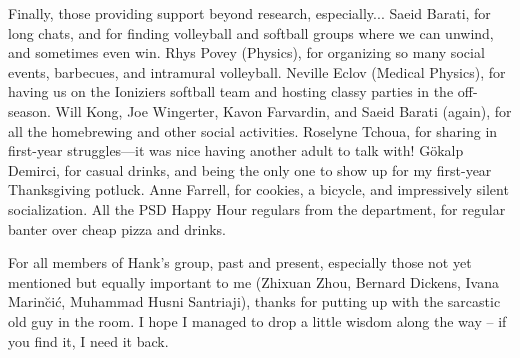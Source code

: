 Finally, those providing support beyond research, especially...
Saeid Barati, for long chats, and for finding volleyball and softball groups where we can unwind, and sometimes even win.
Rhys Povey (Physics), for organizing so many social events, barbecues, and intramural volleyball.
Neville Eclov (Medical Physics), for having us on the Ioniziers softball team and hosting classy parties in the off-season.
Will Kong, Joe Wingerter, Kavon Farvardin, and Saeid Barati (again), for all the homebrewing and other social activities.
Roselyne Tchoua, for sharing in first-year struggles---it was nice having another adult to talk with!
G{\"o}kalp Demirci, for casual drinks, and being the only one to show up for my first-year Thanksgiving potluck.
Anne Farrell, for cookies, a bicycle, and impressively silent socialization.
All the PSD Happy Hour regulars from the department, for regular banter over cheap pizza and drinks.

For all members of Hank's group, past and present, especially those not yet mentioned but equally important to me (Zhixuan Zhou, Bernard Dickens, Ivana Marin{\u c}i{\'c}, Muhammad Husni Santriaji), thanks for putting up with the sarcastic old guy in the room.
I hope I managed to drop a little wisdom along the way -- if you find it, I need it back.
